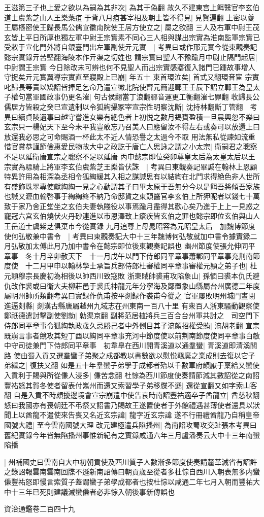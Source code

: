 王滋第三子也上愛之欲以為嗣為其非次|{
	為其于偽翻}
故久不建東宫上餌醫官李玄伯道士虞紫芝山人王樂藥疽于背八月疽甚宰相及朝士皆不得見|{
	見賢遍翻}
上密以夔王屬樞密使王歸長馬公儒宣徽南院使王居方使立之|{
	屬之欲翻}
三人及右軍中尉王茂玄皆上平日所厚也獨左軍中尉王宗實素不同心三人相與謀出宗實為淮南監軍宗實已受敕于宣化門外將自銀臺門出左軍副使亓元實　|{
	考異曰或作邢元實今從東觀奏記懿宗實錄亓苦堅翻海陵本作亓渠之切姓也}
謂宗實曰聖人不豫踰月中尉止隔門起居|{
	中尉謂王宗實}
今日除改未可辨也何不見聖人而出宗實感寤復入諸門已踵故事增人守捉矣亓元實翼導宗實直至寢殿上已崩|{
	年五十}
東首環泣矣|{
	首式又翻環音宦}
宗實叱歸長等責以矯詔皆捧足乞命乃遣宣徽北院使齊元簡迎鄆王壬辰下詔立鄆王為皇太子權句當軍國政事仍更名漼|{
	句古侯翻當丁浪翻鄆音運更工衡翻漼七罪翻}
收歸長公儒居方皆殺之癸巳宣遺制以令狐綯攝冢宰宣宗性明察沈斷|{
	沈持林翻斷丁管翻　考異曰續貞陵遺事曰越守嘗進女樂有絶色者上初悦之數月錫賚盈積一旦晨興忽不樂曰玄宗只一楊妃天下至今未平我豈敢忘乃召美人曰應留汝不得左右或奏可以放還上曰放還我必思之可命賜酒一杯此太不近人情恐譽之太過今不取}
用法無私從諫如流重惜官賞恭謹節儉惠愛民物故大中之政訖于唐亡人思詠之謂之小太宗|{
	衛嗣君之聰察不足以延衛唐宣宗之聰察不足以延唐}
丙申懿宗即位癸卯尊皇太后為太皇太后以王宗實為驃騎上將軍李玄伯虞紫芝王樂皆伏誅　|{
	考異曰東觀奏記畢諴在翰林上恩顧特異許用為相深為丞相令狐綯緩其入相之謀諴思有以結綯在北門求得絶色非人世所有盛飾珠翠專使獻綯綯一見之心動謂其子曰畢太原于吾無分今以是餌吾將傾吾家族也諴又瀝血輸啓事于綯綯終不納乃命邸貨之東頭醫官李玄伯上所狎昵者以錢七十萬致于家乃舍正堂坐之玄伯夫妻執賤役以事焉踰月盡得其歡心矣乃進于上上一見惑之寵冠六宫玄伯燒伏火丹砂連進以市恩澤致上瘡疾皆玄伯之罪也懿宗即位玄伯與山人王岳道士虞紫芝俱棄市今從實録}
九月追尊上母晁昭容為元昭皇太后　加魏博節度使何弘敬兼中書令　|{
	考異曰東觀奏記大中十三年魏博何弘敬就加中書令據實録二月弘敬加太傅此月乃加中書令在懿宗即位後東觀奏記誤也}
幽州節度使張允伸同平章事　冬十月辛卯赦天下　十一月戊午以門下侍郎同平章事蕭鄴同平章事充荆南節度使　十二月甲申以翰林學士承旨兵部侍郎杜審權同平章事審權元頴之弟子也|{
	杜元穎穆宗長慶初為相後以帥西川致寇敗}
浙東賊帥裘甫攻陷象山|{
	孫愐曰裘本仇氏避仇改作裘或曰衛大夫柳莊邑于裘氏神龍元年分寧海及鄮置象山縣屬台州廣德二年度屬明州帥所類翻考異曰實録作仇甫按平剡録作裘甫今從之}
官軍屢敗明州城門晝閉進逼剡縣|{
	剡漢古縣唐屬越州九域志在州東南一百八十里}
有衆百人浙東騷動觀察使鄭祇德遣討擊副使劉勍|{
	勍渠京翻}
副將范居植將兵三百合台州軍共討之　司空門下侍郎同平章事令狐綯執政歲久忌勝己者中外側目其子滈頗招權受賄|{
	滈胡老翻}
宣宗既崩言事者競攻其短丁酉以綯同平章事充河中節度使以前荆南節度使同平章事白敏中守司徒兼門下侍郎同平章事　初韋臯在西川開青溪道以通羣蠻|{
	青溪道即清溪關路}
使由蜀入貢又選羣蠻子弟聚之成都教以書數欲以慰悦羈縻之業成則去復以它子弟繼之|{
	復扶又翻}
如是五十年羣蠻子弟學于成都者殆以千數軍府頗厭于稟給又蠻使入貢利于賜與所從傔人浸多|{
	傔苦念翻}
杜悰為西川節度使奏請節減其數詔從之南詔豐祐怒其賀冬使者留表付嶲州而還又索習學子弟移牒不遜|{
	還從宣翻又如字索山客翻}
自是入貢不時頗擾邊境會宣宗崩遣中使告哀時南詔豐祐適卒子酋龍立|{
	酋慈秋翻}
怒曰我國亦有喪朝廷不弔祭又詔書乃賜故王遂置使者于外館禮遇甚薄使者還具以狀聞上以酋龍不遣使來告喪又名近玄宗諱|{
	龍字近玄宗諱}
遂不行冊禮酋龍乃自稱皇帝國號大禮|{
	至今雲南國號大理}
改元建極遣兵陷播州|{
	為南詔攻蜀攻交趾張本考異曰舊紀實錄今年皆無陷播州事惟新紀有之實錄咸通六年三月盧潘奏云大中十三年南蠻陷播}


|{
	州補國史曰雲南自大中初朝貢使及西川質子人數漸多節度使奏請釐革減省有詔許之錄詔報雲南雲南回牒不遜新南詔傳曰朝貢歲至從者多杜悰自西川入朝表無多内蠻傔豐祐怒即慢言索質子蓋謂蠻子弟學成都者也按杜悰以咸通二年七月入朝而豐祐大中十三年已死則建議減蠻傔者必非悰入朝後事新傳誤也}


資治通鑑卷二百四十九
